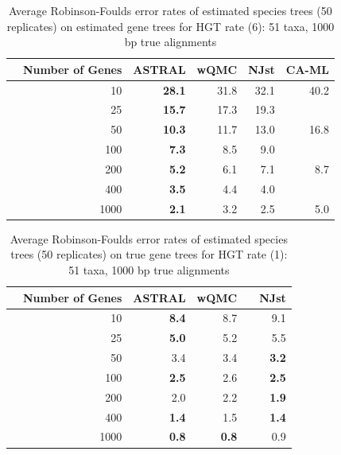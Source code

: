 \begin{table}[h!]
\begin{tabular}{rrrrrr}
 & Number of Genes & ASTRAL & wQMC  & NJst & CA-ML\\
\hline
 & 10 & \textbf{28.1} & 31.8 &   32.1 & 40.2 \\
 & 25 & \textbf{15.7} & 17.3 &   19.3 & \\
 & 50 & \textbf{10.3} & 11.7 &   13.0 & 16.8\\
 & 100 & \textbf{7.3} & 8.5 &   9.0 & \\
 & 200 & \textbf{5.2} & 6.1 &   7.1 & 8.7 \\
 & 400 & \textbf{3.5} & 4.4 &   4.0 & \\
 & 1000 & \textbf{2.1} & 3.2  & 2.5 & 5.0\\
\end{tabular}
\caption[Error rates of estimated species trees (50 replicates)  on estimated gene trees for HGT rate 6]{Average Robinson-Foulds error rates of estimated species trees (50 replicates)  on estimated gene trees for HGT rate (6): 51 taxa, 1000 bp true alignments}

\label{hgt::table6}
\end{table}



\begin{table}[h!]
\begin{tabular}{rrrrrr}
 & Number of Genes & ASTRAL & wQMC &  & NJst\\
\hline
 & 10 & \textbf{8.4} & 8.7 &  & 9.1\\
 & 25 & \textbf{5.0} & 5.2 &  & 5.5\\
 & 50 & 3.4 & 3.4 &  & \textbf{3.2} \\
 & 100 & \textbf{2.5} & 2.6 &  & \textbf{2.5} \\
 & 200 & 2.0 & 2.2 &  & \textbf{1.9}\\
 & 400 & \textbf{1.4} & 1.5 &  & \textbf{1.4} \\
 & 1000 & \textbf{0.8} & \textbf{0.8} &  & 0.9\\
\end{tabular}
\caption[Error rates of estimated species trees (50 replicates)  on true gene trees for HGT rate 1]{Average Robinson-Foulds error rates of estimated species trees (50 replicates)  on true gene trees for HGT rate (1): 51 taxa, 1000 bp true alignments}
\label{hgt::table7}
\end{table}

